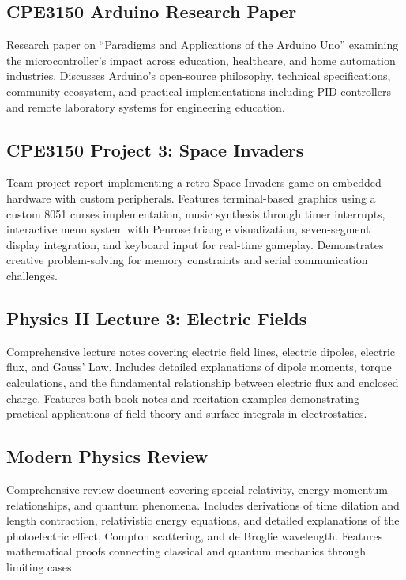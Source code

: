 \documentclass{mst}
\begin{document}
\subsection*{CPE3150 Arduino Research Paper}
Research paper on ``Paradigms and Applications of the Arduino Uno'' examining the microcontroller's impact across education, healthcare, and home automation industries. Discusses Arduino's open-source philosophy, technical specifications, community ecosystem, and practical implementations including PID controllers and remote laboratory systems for engineering education.

\subsection*{CPE3150 Project 3: Space Invaders}
Team project report implementing a retro Space Invaders game on embedded hardware with custom peripherals. Features terminal-based graphics using a custom 8051 curses implementation, music synthesis through timer interrupts, interactive menu system with Penrose triangle visualization, seven-segment display integration, and keyboard input for real-time gameplay. Demonstrates creative problem-solving for memory constraints and serial communication challenges.

\subsection*{Physics II Lecture 3: Electric Fields}
Comprehensive lecture notes covering electric field lines, electric dipoles, electric flux, and Gauss' Law. Includes detailed explanations of dipole moments, torque calculations, and the fundamental relationship between electric flux and enclosed charge. Features both book notes and recitation examples demonstrating practical applications of field theory and surface integrals in electrostatics.

\subsection*{Modern Physics Review}
Comprehensive review document covering special relativity, energy-momentum relationships, and quantum phenomena. Includes derivations of time dilation and length contraction, relativistic energy equations, and detailed explanations of the photoelectric effect, Compton scattering, and de Broglie wavelength. Features mathematical proofs connecting classical and quantum mechanics through limiting cases.
\end{document}
